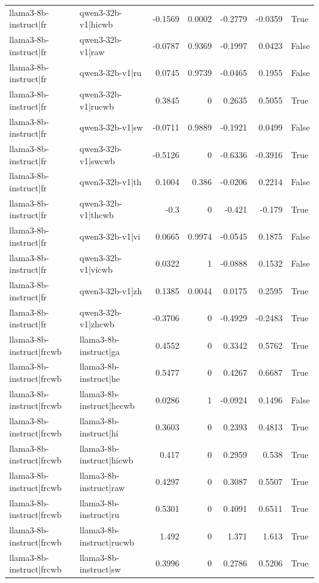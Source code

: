 \begin{table}
\begin{tabular}{l l r r r r l}
llama3-8b-instruct|fr & qwen3-32b-v1|hicwb & -0.1569 & 0.0002 & -0.2779 & -0.0359 & True \\
llama3-8b-instruct|fr & qwen3-32b-v1|raw & -0.0787 & 0.9369 & -0.1997 & 0.0423 & False \\
llama3-8b-instruct|fr & qwen3-32b-v1|ru & 0.0745 & 0.9739 & -0.0465 & 0.1955 & False \\
llama3-8b-instruct|fr & qwen3-32b-v1|rucwb & 0.3845 & 0 & 0.2635 & 0.5055 & True \\
llama3-8b-instruct|fr & qwen3-32b-v1|sw & -0.0711 & 0.9889 & -0.1921 & 0.0499 & False \\
llama3-8b-instruct|fr & qwen3-32b-v1|swcwb & -0.5126 & 0 & -0.6336 & -0.3916 & True \\
llama3-8b-instruct|fr & qwen3-32b-v1|th & 0.1004 & 0.386 & -0.0206 & 0.2214 & False \\
llama3-8b-instruct|fr & qwen3-32b-v1|thcwb & -0.3 & 0 & -0.421 & -0.179 & True \\
llama3-8b-instruct|fr & qwen3-32b-v1|vi & 0.0665 & 0.9974 & -0.0545 & 0.1875 & False \\
llama3-8b-instruct|fr & qwen3-32b-v1|vicwb & 0.0322 & 1 & -0.0888 & 0.1532 & False \\
llama3-8b-instruct|fr & qwen3-32b-v1|zh & 0.1385 & 0.0044 & 0.0175 & 0.2595 & True \\
llama3-8b-instruct|fr & qwen3-32b-v1|zhcwb & -0.3706 & 0 & -0.4929 & -0.2483 & True \\
llama3-8b-instruct|frcwb & llama3-8b-instruct|ga & 0.4552 & 0 & 0.3342 & 0.5762 & True \\
llama3-8b-instruct|frcwb & llama3-8b-instruct|he & 0.5477 & 0 & 0.4267 & 0.6687 & True \\
llama3-8b-instruct|frcwb & llama3-8b-instruct|hecwb & 0.0286 & 1 & -0.0924 & 0.1496 & False \\
llama3-8b-instruct|frcwb & llama3-8b-instruct|hi & 0.3603 & 0 & 0.2393 & 0.4813 & True \\
llama3-8b-instruct|frcwb & llama3-8b-instruct|hicwb & 0.417 & 0 & 0.2959 & 0.538 & True \\
llama3-8b-instruct|frcwb & llama3-8b-instruct|raw & 0.4297 & 0 & 0.3087 & 0.5507 & True \\
llama3-8b-instruct|frcwb & llama3-8b-instruct|ru & 0.5301 & 0 & 0.4091 & 0.6511 & True \\
llama3-8b-instruct|frcwb & llama3-8b-instruct|rucwb & 1.492 & 0 & 1.371 & 1.613 & True \\
llama3-8b-instruct|frcwb & llama3-8b-instruct|sw & 0.3996 & 0 & 0.2786 & 0.5206 & True \\

\end{tabular}
\end{table}
